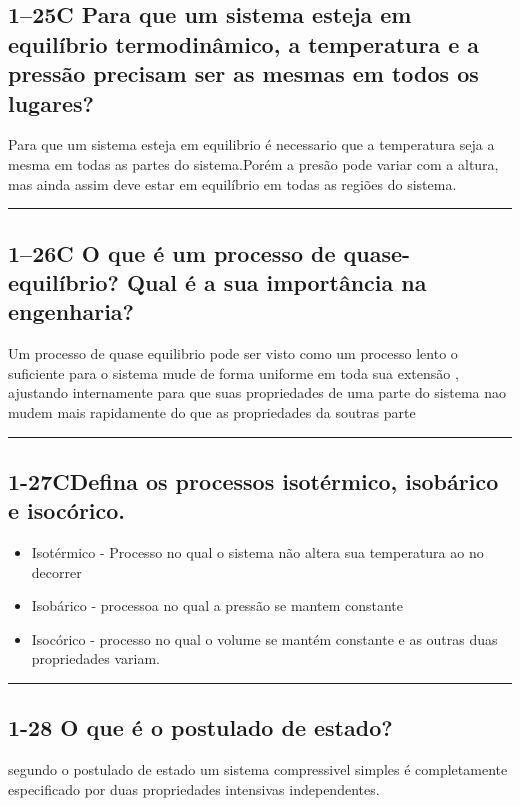 \documentclass{article}
\begin{document}
\subsection*{1–25C Para que um sistema esteja em equilíbrio termodinâmico, a temperatura e a pressão precisam ser as mesmas em todos os lugares?}
Para que um sistema esteja em equilibrio é necessario que a temperatura seja a mesma em todas as partes do sistema.Porém a presão pode variar com a altura, mas ainda assim deve estar em equilíbrio em todas as regiões do sistema.\\
\noindent\rule{\textwidth}{0.4pt}
\subsection*{1–26C O que é um processo de quase-equilíbrio? Qual é a sua importância na engenharia?}
Um processo de quase equilibrio pode ser visto como um processo lento o suficiente para o sistema mude de  forma  uniforme em toda sua extensão , ajustando internamente para que suas propriedades de uma parte do sistema nao mudem mais rapidamente do que as propriedades da soutras parte \\
\noindent\rule{\textwidth}{0.4pt}
\subsection*{1-27CDefina os processos isotérmico, isobárico e isocórico.}
\begin{itemize}
    \item Isotérmico - Processo no qual o sistema não altera sua temperatura  ao no decorrer
    \item Isobárico - processoa no qual a pressão se mantem constante
    \item Isocórico - processo no qual o volume se mantém constante e as outras duas propriedades variam.
\end{itemize}
\noindent\rule{\textwidth}{0.4pt}
\subsection*{1-28  O que é o postulado de estado?}
segundo o postulado de estado um sistema compressivel simples é completamente especificado por duas propriedades intensivas independentes.
\end{document}
